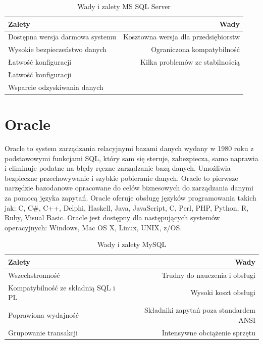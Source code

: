 \documentclass[oneside,polski,logo,indent]{amuthesis}
\begin{document}
\begin{table}[H]
\caption{Wady i zalety MS SQL Server}
\label{tabela-MS SQL Server}
\centering
\begin{adjustbox}{width=1\textwidth}
\small
\begin{tabular}{lr}
\toprule
Zalety & Wady\\
\midrule
Dostępna wersja darmowa systemu & Kosztowna wersja dla przedsiębiorstw\\
Wysokie bezpieczeństwo danych & Ograniczona kompatybilność\\
Łatwość konfiguracji & Kilka problemów ze stabilnością\\
Łatwość konfiguracji & \\
Wsparcie odzyskiwania danych & \\
\bottomrule
\end{tabular}
\end{adjustbox}
\end{table}
\section{Oracle}
Oracle to system zarządzania relacyjnymi bazami danych wydany w 1980 roku z podstawowymi funkcjami SQL, który sam się steruje, zabezpiecza, samo naprawia i eliminuje podatne na błędy ręczne zarządzanie bazą danych. Umożliwia bezpieczne przechowywanie i szybkie pobieranie danych. Oracle to pierwsze narzędzie bazodanowe opracowane do celów biznesowych do zarządzania danymi za pomocą języka zapytań. 
Oracle oferuje obsługę języków programowania takich jak: C, C\#, C++, Delphi, Haskell, Java, JavaScript, C, Perl, PHP, Python, R, Ruby, Visual Basic.
Oracle jest dostępny dla następujących systemów operacyjnych: Windows, Mac OS X, Linux, UNIX, z/OS.

\begin{table}[H]
\caption{Wady i zalety MySQL}
\label{tabela-Oracle}
\centering
\begin{adjustbox}{width=1\textwidth}
\small
\begin{tabular}{lr}
\toprule
Zalety & Wady\\
\midrule
Wszechstronność & Trudny do nauczenia i obsługi\\
Kompatybilność ze składnią SQL i PL & Wysoki koszt obsługi\\
Poprawiona wydajność & Składniki zapytań poza standardem ANSI \\
Grupowanie transakcji & Intensywne obciążenie sprzętu\\
\bottomrule
\end{tabular}
\end{adjustbox}
\end{table}
\end{document}
